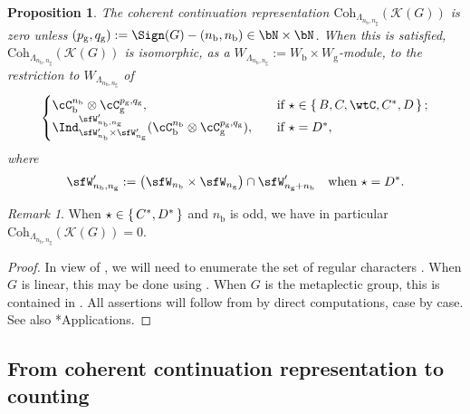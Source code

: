 \documentclass[12pt,a4paper]{amsart}
\newcommand{\CK}{{\mathcal {K}}}
\numberwithin{equation}{section}
\newtheorem{prop}[thm]{Proposition}
\theoremstyle{remark}
\newtheorem{remark}[thm]{Remark}
\def\Coh{\mathrm{Coh}}
\begin{document}
\begin{prop}\label{prop:cohBCD}
  The coherent continuation representation $\Coh_{\Lambda_{n_{\mathrm b},n_{\mathrm g}}}(\CK(G))$ is zero unless $(p_{\mathrm g},q_{\mathrm g}):= \Sign(G) - (n_{\mathrm b},n_{\mathrm b})\in \bN\times \bN$. When this is satisfied, $\Coh_{\Lambda_{n_{\mathrm b},n_{\mathrm g}}}(\CK(G))$ is isomorphic, as a $W_{\Lambda_{n_{\mathrm b},n_{\mathrm g}}}:= W_{\mathrm b}\times W_{\mathrm g}$-module, to the restriction to $W_{\Lambda_{n_{\mathrm b},n_{\mathrm g}}}$ of
  \[
    \begin{cases}
      \cC_{\mathrm b}^{n_{\mathrm b}}\otimes\cC_{\mathrm g}^{p_{\mathrm g},q_{\mathrm g}}, &\quad \text{if } \star \in \set{B,C,\wtC,C^{*},D};\\
      \Ind_{\sfW'_{n_{\mathrm b}}\times \sfW'_{n_{\mathrm g}}}^{\sfW_{n_{\mathrm b},n_{\mathrm g}}'}(\cC_{\mathrm b}^{n_{\mathrm b}}\otimes\cC_{\mathrm g}^{p_{\mathrm g},q_{\mathrm g}}), &\quad \text{if } \star = D^{*}, \\
    \end{cases}
  \]
  where
  \[
    \sfW_{n_{\mathrm b},n_{\mathrm g}}' := \left(\sfW_{n_{\mathrm b}}\times \sfW_{n_{\mathrm g}}\right)\cap \sfW'_{n_{\mathrm g}+n_{\mathrm b}} \quad \text{when $\star = D^{*}$.}
  \]
\end{prop}

\begin{remark}
  When $\star \in \set{C^{*},D^{*}}$ and $n_{\mathrm b}$ is odd, we have in particular $\Coh_{\Lambda_{n_{\mathrm b},n_{\mathrm g}}}(\CK(G))=0$.
\end{remark}

\begin{proof}
  In view of , we will need to enumerate the set of regular characters \cite[Section 2]{V4}.
  When $G$ is linear, this may be done using \cite{AC}. When $G$ is the metaplectic group, this is contained in \cite{RT1,RT2}. All assertions will follow from  by direct computations, case by case. See also
  \cite{Mc}*{Applications}.
\end{proof}

\subsection{From coherent continuation representation to counting}
\end{document}
